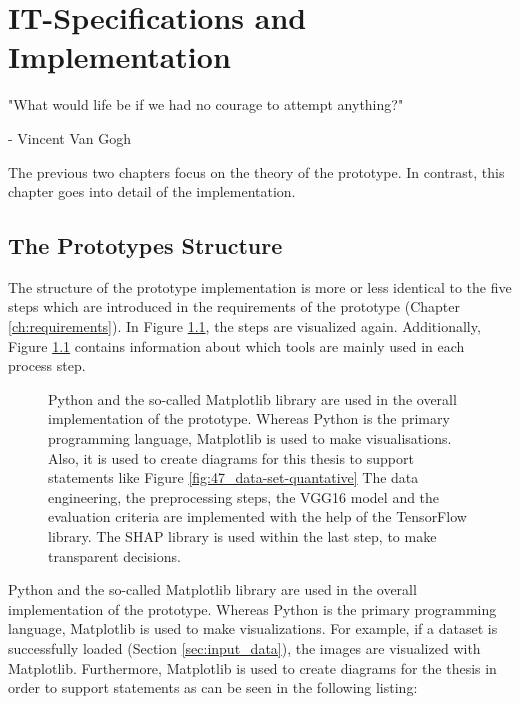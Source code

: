 
\chapter{IT-Specifications and Implementation}
\label{ch:it_specifications}
\epigraph{"What would life be if we had no courage to attempt anything?"}{- Vincent Van Gogh}


The previous two chapters focus on the theory of the prototype. In contrast, this chapter goes into detail of the implementation.

\section{The Prototypes Structure}

The structure of the prototype implementation is more or less identical to the five steps which are introduced in the requirements of the prototype (Chapter \ref{ch:requirements}). In Figure \ref{fig:51_Requirements_process_libs}, the steps are visualized again. Additionally, Figure \ref{fig:51_Requirements_process_libs} contains information about which tools are mainly used in each process step.

\begin{figure}[htp]
	\centering
	\caption{Python and the so-called Matplotlib library are used in the overall implementation of the prototype. Whereas Python is the primary programming language, Matplotlib is used to make visualisations. Also, it is used to create diagrams for this thesis to support statements like Figure \ref{fig:47_data-set-quantative} The data engineering, the preprocessing steps, the VGG16 model and the evaluation criteria are implemented with the help of the TensorFlow library. The SHAP library is used within the last step, to make transparent decisions.}
	\label{fig:51_Requirements_process_libs}
\end{figure}

Python and the so-called Matplotlib library are used in the overall implementation of the prototype. Whereas Python is the primary programming language, Matplotlib is used to make visualizations. For example, if a  dataset is successfully loaded (Section \ref{sec:input_data}), the images are visualized with Matplotlib. Furthermore, Matplotlib is used to create diagrams for the thesis in order to support statements as can be seen in the following listing:

